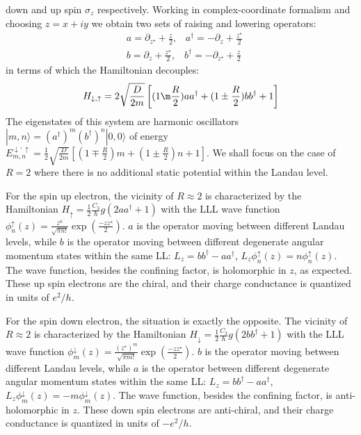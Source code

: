 \documentclass[prl,aps,amssymb,shownopacs,twocolumn]{revtex4}
\begin{document}
 down and up spin $\sigma_z$ respectively. Working in
complex-coordinate formalism and choosing $z = x+ i y$ we obtain two
sets of raising and lowering operators:
\begin{eqnarray}
& a = \partial_{z^\star} + \frac{z}{2}, \;\;\; a^\dagger = - \partial_z + \frac{z^\star}{2} \nonumber \\
& b = \partial_{z} + \frac{z^\star}{2}, \;\;\; b^\dagger = -
\partial_{z^\star} + \frac{z}{2}
\end{eqnarray}
\noindent in terms of which the Hamiltonian decouples:
\begin{equation}
H_{ \downarrow, \uparrow} =2 \sqrt{\frac{D}{2m}} \left[(1 \m\frac{R}{2} )
a a^\dagger + (1 \pm \frac{R}{2}) b b^\dagger  + 1
\right]
\end{equation}
\noindent The eigenstates of this system are harmonic oscillators
$|m,n\rangle = (a^\dagger)^m (b^\dagger)^n |0,0\rangle$ of energy
$E^{ \downarrow, \uparrow}_{m,n} = \frac{1}{2} \sqrt{\frac{D}{2m}}
\left[(1 \mp \frac{R}{2} ) m + (1 \pm \frac{R}{2}) n + 1 \right]$.
We shall focus on the case of $R=2$ where there is no additional
static potential within the Landau level.

For the spin up electron, the vicinity of $R \approx 2$ is
characterized by the Hamiltonian $H_{\uparrow} = \frac{1}{2}
\frac{C_3}{\hbar} g (2 a a^\dagger + 1) $ with the LLL wave function
$\phi^\uparrow_n(z) =\frac{z^n}{\sqrt{\pi n ! } }\exp(\frac{-z
z^\star}{2})$. $a$ is the operator moving between different Landau
levels, while $b$ is the operator moving between different
degenerate angular momentum states within the same LL: $L_z= b
b^\dagger - a a^\dagger$, $L_z \phi^\uparrow_n(z) =  n
\phi^\uparrow_n(z)$. The wave function, besides the confining
factor, is holomorphic in $z$, as expected. These up spin electrons
are the chiral, and their charge conductance is quantized in units
of $e^2/h$.


For the spin down electron, the situation is exactly the opposite.
The vicinity of $R \approx 2$ is characterized by the Hamiltonian
$H_{\downarrow} = \frac{1}{2} \frac{C_3}{\hbar} g (2 b b^\dagger +
1) $ with the LLL wave function $\phi^\downarrow_m(z)
=\frac{(z^\star)^m}{\sqrt{\pi m ! } }\exp(\frac{-z z^\star}{2})$.
$b$ is the operator moving between different Landau levels, while
$a$ is the operator between different degenerate angular momentum
states within the same LL: $L_z= b b^\dagger - a a^\dagger$, $L_z
\phi^\downarrow_m(z) = - m \phi^\downarrow_m(z)$. The wave function,
besides the confining factor, is anti-holomorphic in $z$. These down
spin electrons are anti-chiral, and their charge conductance is
quantized in units of $-e^2/h$.
\end{document}
